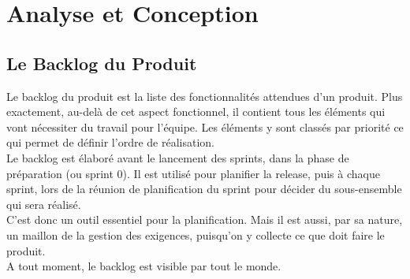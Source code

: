 \chapter{Analyse et Conception} %

\label{Chapitre 2} %



\section{Le Backlog du Produit}
Le backlog du produit est la liste des fonctionnalités attendues d'un produit. Plus exactement, au-delà de cet aspect fonctionnel, il contient tous les éléments qui vont nécessiter du travail pour l'équipe. Les éléments y sont classés par priorité ce qui permet de définir l'ordre de réalisation.\\[0.5cm]
Le backlog est élaboré avant le lancement des sprints, dans la phase de préparation (ou sprint 0). Il est utilisé pour planifier la release, puis à chaque sprint, lors de la réunion de planification du sprint pour décider du sous-ensemble qui sera réalisé.\\[0.2cm]
C'est donc un outil essentiel pour la planification. Mais il est aussi, par sa nature, un maillon de la gestion des exigences, puisqu'on y collecte ce que doit faire le produit.\\[0.2cm]
A tout moment, le backlog est visible par tout le monde.
